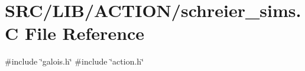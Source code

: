 \hypertarget{schreier__sims_8_c}{}\section{S\+R\+C/\+L\+I\+B/\+A\+C\+T\+I\+O\+N/schreier\+\_\+sims.C File Reference}
\label{schreier__sims_8_c}
{\ttfamily \#include \char`\"{}galois.\+h\char`\"{}}\newline
{\ttfamily \#include \char`\"{}action.\+h\char`\"{}}\newline
